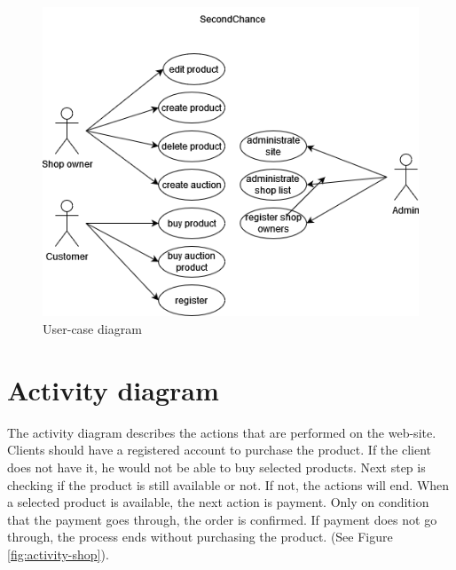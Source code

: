 \begin{figure}[h!]
    \centering
    \includegraphics[scale=0.9]{figures/user-case.png}
    \caption{User-case diagram}
    \label{fig:user-case}
\end{figure}
\clearpage


\section{Activity diagram}
The activity diagram describes the actions that are performed on the web-site. Clients should have a registered account to purchase the product. If the client does not have it, he would not be able to buy selected products. Next step is checking if the product is still available or not. If not, the actions will end. When a selected product is available, the next action is payment. Only on condition that the payment goes through, the order is confirmed. If payment does not go through, the process ends without purchasing the product. (See Figure \ref{fig:activity-shop}).

